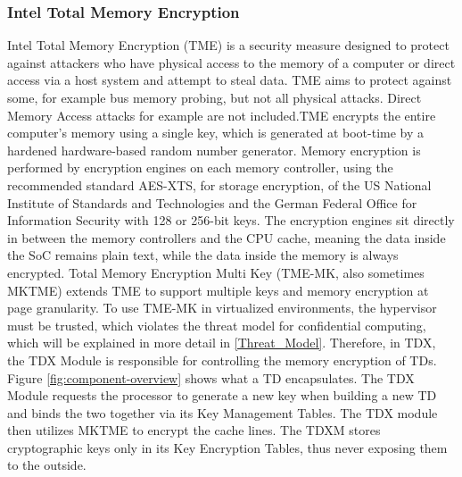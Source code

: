 \subsubsection{Intel Total Memory Encryption}
\label{Memory Encrpytion}
Intel Total Memory Encryption (TME) is a security measure designed to protect against attackers who have physical access to the memory of a computer or direct access via a host system and attempt to steal data. TME aims to protect against some, for example bus memory probing, but not all physical attacks. Direct Memory Access attacks for example are not included.TME encrypts the entire computer's memory using a single key, which is generated at boot-time by a hardened hardware-based random number generator. Memory encryption is performed by encryption engines on each memory controller, using the recommended standard AES-XTS, for storage encryption, of the US National Institute of Standards and Technologies \cite{morris_dworkin_recommendation_2015} and the German Federal Office for Information Security with 128 or 256-bit keys\cite[~p. 24]{bundesamt_fur_sicherheit_in_der_informationstechnik_cryptographic_2023}. The encryption engines sit directly in between the memory controllers and the CPU cache, meaning the data inside the SoC remains plain text, while the data inside the memory is always encrypted. Total Memory Encryption Multi Key (TME-MK, also sometimes MKTME) extends TME to support multiple keys and memory encryption at page granularity. To use TME-MK in virtualized environments, the hypervisor must be trusted, which violates the threat model for confidential computing, which will be explained in more detail in \cref{Threat_Model}. Therefore, in TDX, the TDX Module is responsible for controlling the memory encryption of TDs. Figure \ref{fig:component-overview} shows what a TD encapsulates. The TDX Module requests the processor to generate a new key when building a new TD and binds the two together via its Key Management Tables. The TDX module then utilizes MKTME to encrypt the cache lines. The TDXM stores cryptographic keys only in its Key Encryption Tables, thus never exposing them to the outside\cite{cheng_intel_2023}. 

